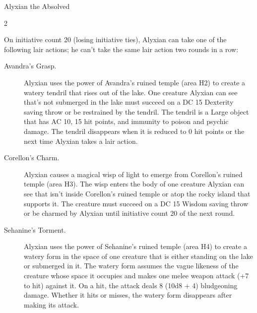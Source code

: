 \documentclass[10pt,a4paper,twoside,bg=print,twocolumn,openany,nodeprecatedcode]{dndbook}
\begin{document}
\begin{DndMonster}[float*=b,width=\textwidth + 8pt]{Alyxian the Absolved}
\begin{multicols}{2}
\begin{DndMonsterLegendaryActions}
\end{DndMonsterLegendaryActions}
On initiative count 20 (losing initiative ties), Alyxian can take one of the following lair actions; he can't take the same lair action two rounds in a row:


\begin{description}
\item[Avandra's Grasp.]
Alyxian uses the power of Avandra's ruined temple (area H2) to create a watery tendril that rises out of the lake. One creature Alyxian can see that's not submerged in the lake must succeed on a DC 15 Dexterity saving throw or be restrained by the tendril. The tendril is a Large object that has AC 10, 15 hit points, and immunity to poison and psychic damage. The tendril disappears when it is reduced to 0 hit points or the next time Alyxian takes a lair action.

\item[Corellon's Charm.]
Alyxian causes a magical wisp of light to emerge from Corellon's ruined temple (area H3). The wisp enters the body of one creature Alyxian can see that isn't inside Corellon's ruined temple or atop the rocky island that supports it. The creature must succeed on a DC 15 Wisdom saving throw or be charmed by Alyxian until initiative count 20 of the next round.

\item[Sehanine's Torment.]
Alyxian uses the power of Sehanine's ruined temple (area H4) to create a watery form in the space of one creature that is either standing on the lake or submerged in it. The watery form assumes the vague likeness of the creature whose space it occupies and makes one melee weapon attack (+7 to hit) against it. On a hit, the attack deals 8 (10d8 + 4) bludgeoning damage. Whether it hits or misses, the watery form disappears after making its attack.

\end{description}


\end{multicols}
\end{DndMonster}
\end{document}
